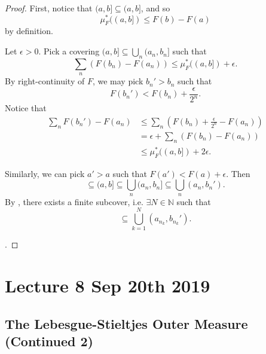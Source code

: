 \documentclass[notoc,notitlepage]{tufte-book}
\begin{document}
\begin{proof}
  First, notice that $(a, b] \subseteq (a, b]$, and so
  \begin{equation*}
    \mu_F^*((a, b]) \leq F(b) - F(a)
  \end{equation*}
  by definition.

  Let $\epsilon > 0$. Pick a covering $(a, b] \subseteq \bigcup_{n} (a_n, b_n]$
  such that
  \begin{equation*}
    \sum_{n} ( F(b_n) - F(a_n) ) \leq \mu_F^*((a, b]) + \epsilon.
  \end{equation*}
  By right-continuity of $F$, we may pick $b_n' > b_n$ such that
  \begin{equation*}
    F(b_n') < F(b_n) + \frac{\epsilon}{2^n}.
  \end{equation*}
  Notice that
  \begin{align*}
    \sum_{n} F(b_n') - F(a_n)
    &\leq \sum_{n} ( F(b_n) + \frac{\epsilon}{2^n} - F(a_n) ) \\
    &= \epsilon + \sum_{n} ( F(b_n) - F(a_n) ) \\
    &\leq \mu_F^*((a, b]) + 2 \epsilon.
  \end{align*}

  Similarly, we can pick $a' > a$ such that $F(a') < F(a) + \epsilon$.
  Then
  \begin{equation*}
    [a, b] \subseteq (a, b] \subseteq \bigcup_{n} (a_n, b_n] \subseteq
    \bigcup_{n} (a_n, b_n').
  \end{equation*}
  By , there exists a finite subcover, i.e.
  $\exists N \in \mathbb{N}$ such that
  \begin{equation*}
    [a', b] \subseteq \bigcup_{k=1}^{N} (a_{n_k}, b_{n_k}').
  \end{equation*}
  
  .

\end{proof}



\chapter{Lecture 8 Sep 20th 2019}%
\label{chp:lecture_8_sep_20th_2019}

\section{The Lebesgue-Stieltjes Outer Measure (Continued 2)}%
\label{sec:the_lebesgue_stieltjes_outer_measure_continued_2}
\end{document}
